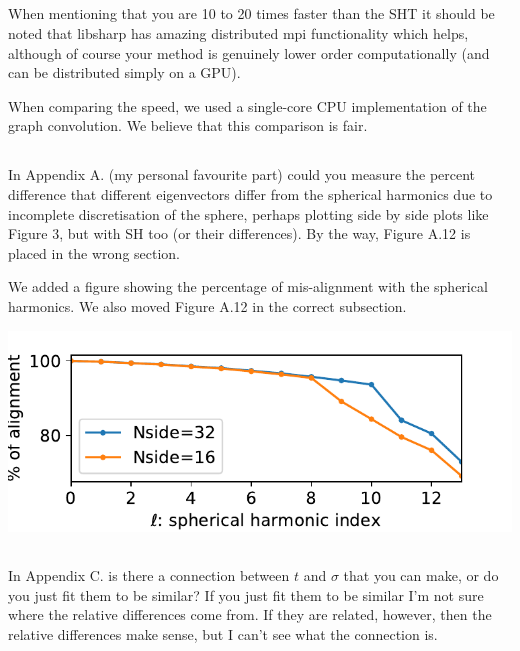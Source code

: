 \documentclass[12pt,a4paper]{article}
\newcommand{\nati}[1]{{\color[rgb]{.1,.6,.1}{NP: #1}}}
\newcommand{\todo}[1]{{\color[rgb]{.6,.1,.6}{TODO: #1}}}
\newcommand{\1}{\b{1}}              %
\newcommand{\0}{\b{0}}              %
\begin{document}
\subsection{}
\begin{mdframed}[style=comment] 
When mentioning that you are 10 to 20 times faster than the SHT it should be noted that libsharp has amazing distributed mpi functionality which helps, although of course your method is genuinely lower order computationally (and can be distributed simply on a GPU).
\end{mdframed}
When comparing the speed, we used a single-core CPU implementation of the graph convolution. We believe that this comparison is fair.
\nati{Is this sufficient?}

\subsection{}
\begin{mdframed}[style=comment] 
In Appendix A. (my personal favourite part) could you measure the percent difference that different eigenvectors differ from the spherical harmonics due to incomplete discretisation of the sphere, perhaps plotting side by side plots like Figure 3, but with SH too (or their differences). By the way, Figure A.12 is placed in the wrong section.
\end{mdframed}
\todo{Assigned: @nati, @michael}
We added a figure showing the percentage of mis-alignment with the spherical harmonics. We also moved Figure A.12 in the correct subsection.

\begin{center}
\includegraphics[width=0.5\linewidth]{figures/subspace_alignment_percentage.pdf}
\end{center}

\subsection{}
\begin{mdframed}[style=comment] 
In Appendix C. is there a connection between $t$ and $\sigma$ that you can make, or do you just fit them to be similar? If you just fit them to be similar I'm not sure where the relative differences come from. If they are related, however, then the relative differences make sense, but I can't see what the connection is.
\end{mdframed}
\end{document}
